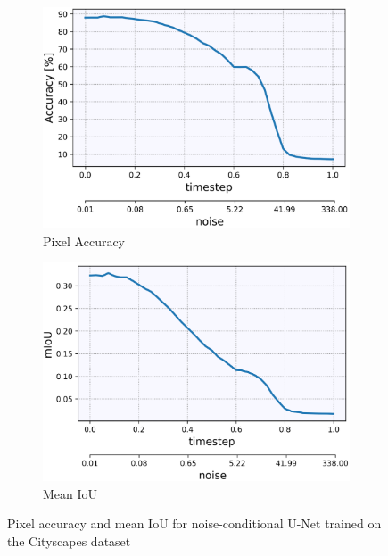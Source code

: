 \begin{figure}[] \label{fig:5.9}
    \centering
    \begin{subfigure}[b]{0.49\textwidth}
        \centering
         \includegraphics[width=\textwidth]{Chapters/figures/experiments/cityscapes/accuracy_cityscapes.PNG}
         \caption{Pixel Accuracy}
    \end{subfigure}
    \begin{subfigure}[b]{0.49\textwidth}
        \centering
         \includegraphics[width=\textwidth]{Chapters/figures/experiments/cityscapes/mIoU_cityscapes.PNG}
         \caption{Mean IoU}
    \end{subfigure}
    \caption[Pixel accuracy and mIoU for U-Net on Cityscapes dataset]{Pixel accuracy and mean IoU for noise-conditional U-Net trained on the Cityscapes dataset}
\end{figure}
